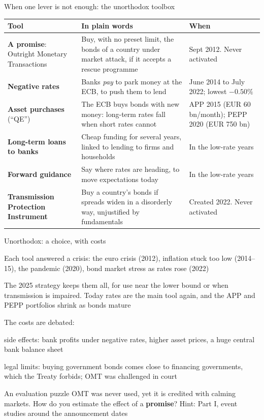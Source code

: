 \documentclass[aspectratio=169,xcolor=table]{beamer}
\begin{document}
\begin{frame}{When one lever is not enough: the unorthodox toolbox}
\scriptsize
\renewcommand{\arraystretch}{1.0}
\begin{tabular}{L{3.0cm}L{6.4cm}L{3.6cm}}
\toprule
\textbf{Tool} & \textbf{In plain words} & \textbf{When} \\
\midrule
\textbf{A promise}: Outright Monetary Transactions & Buy, with no preset limit, the bonds of a country under market attack, if it accepts a rescue programme & Sept 2012. Never activated \\
\textbf{Negative rates} & Banks \emph{pay} to park money at the ECB, to push them to lend & June 2014 to July 2022; lowest $-0.50\%$ \\
\textbf{Asset purchases} (``QE'') & The ECB buys bonds with new money: long-term rates fall when short rates cannot & APP 2015 (EUR 60 bn/month); PEPP 2020 (EUR 750 bn) \\
\textbf{Long-term loans to banks} & Cheap funding for several years, linked to lending to firms and households & In the low-rate years \\
\textbf{Forward guidance} & Say where rates are heading, to move expectations today & In the low-rate years \\
\textbf{Transmission Protection Instrument} & Buy a country's bonds if spreads widen in a disorderly way, unjustified by fundamentals & Created 2022. Never activated \\
\bottomrule
\end{tabular}
\end{frame}

\begin{frame}{Unorthodox: a choice, with costs}
\footnotesize
\bi
  \item Each tool answered a crisis: the euro crisis (2012), inflation stuck too low (2014--15), the pandemic (2020), bond market stress as rates rose (2022)
  \item The 2025 strategy keeps them all, for use near the lower bound or when transmission is impaired. Today rates are the main tool again, and the APP and PEPP portfolios shrink as bonds mature
  \item The costs are debated:
  \bi
    \item side effects: bank profits under negative rates, higher asset prices, a huge central bank balance sheet
    \item legal limits: buying government bonds comes close to financing governments, which the Treaty forbids; OMT was challenged in court
  \ei
\ei
\vspace{0.1cm}
\begin{block}{An evaluation puzzle}
OMT was never used, yet it is credited with calming markets. How do you estimate the effect of a \textbf{promise}? Hint: Part I, event studies around the announcement dates
\end{block}
\end{frame}
\end{document}
